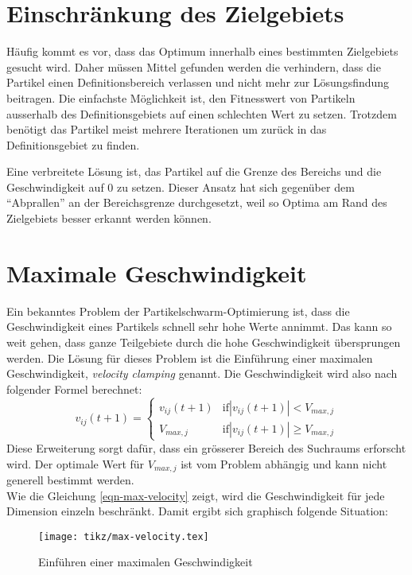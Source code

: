 \section{Einschränkung des Zielgebiets}
Häufig kommt es vor, dass das Optimum innerhalb eines bestimmten Zielgebiets gesucht wird. Daher müssen Mittel gefunden werden die verhindern, dass die Partikel einen Definitionsbereich verlassen und nicht mehr zur Lösungsfindung beitragen. Die einfachste Möglichkeit ist, den Fitnesswert von Partikeln ausserhalb des Definitionsgebiets auf einen schlechten Wert zu setzen. Trotzdem benötigt das Partikel meist mehrere Iterationen um zurück in das Definitionsgebiet zu finden.

Eine verbreitete Lösung ist, das Partikel auf die Grenze des Bereichs und die Geschwindigkeit auf 0 zu setzen. Dieser Ansatz hat sich gegenüber dem ``Abprallen'' an der Bereichsgrenze durchgesetzt, weil so Optima am Rand des Zielgebiets besser erkannt werden können.

\newpage

\section{Maximale Geschwindigkeit}
Ein bekanntes Problem der Partikelschwarm-Optimierung ist, dass die Geschwindigkeit eines Partikels schnell sehr hohe Werte annimmt. Das kann so weit gehen, dass ganze Teilgebiete durch die hohe Geschwindigkeit übersprungen werden. Die Lösung für dieses Problem ist die Einführung einer maximalen Geschwindigkeit, \textit{velocity clamping} genannt. Die Geschwindigkeit wird also nach folgender Formel berechnet:
\begin{equation}
	v_{ij}(t+1) = 
	\begin{cases}
		v_{ij}(t+1) & \text{if} |v_{ij}(t+1)| < V_{max,j} \\
		V_{max,j} & \text{if} |v_{ij}(t+1)| \geq V_{max,j}
	\end{cases}
	\label{eqn-max-velocity}
\end{equation}
Diese Erweiterung sorgt dafür, dass ein grösserer Bereich des Suchraums erforscht wird. Der optimale Wert für $V_{max,j}$ ist vom Problem abhängig und kann nicht generell bestimmt werden. \\

Wie die Gleichung \ref{eqn-max-velocity} zeigt, wird die Geschwindigkeit für jede Dimension einzeln beschränkt. Damit ergibt sich graphisch folgende Situation:

\begin{figure}[htbp]
	\centering
	\texttt{[image: tikz/max-velocity.tex]}
	\caption{Einführen einer maximalen Geschwindigkeit}
	\label{fig-max-velocity}
\end{figure}

